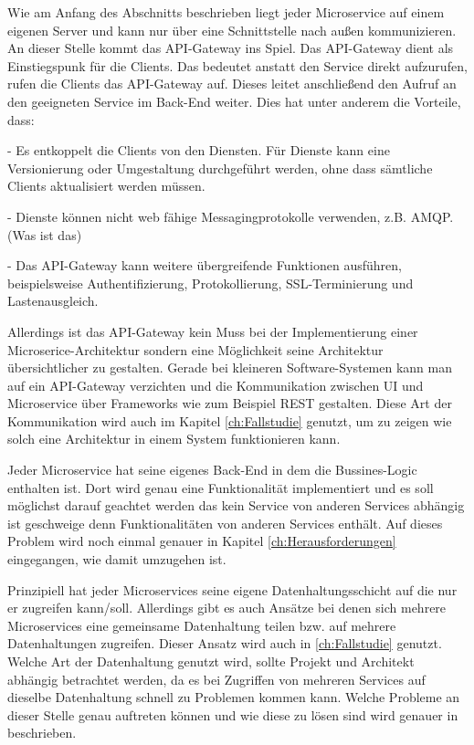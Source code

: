 Wie am Anfang des Abschnitts beschrieben liegt jeder Microservice auf einem eigenen Server und kann nur über eine Schnittstelle nach außen kommunizieren. An dieser Stelle kommt das API-Gateway ins Spiel.
Das API-Gateway dient als Einstiegspunk für die Clients. Das bedeutet anstatt den Service direkt aufzurufen, rufen die Clients das API-Gateway auf. Dieses leitet anschließend den Aufruf an den geeigneten Service im Back-End weiter.  Dies hat unter anderem die Vorteile, dass\cite{microsoft}:
\begin{description}
	\item - Es entkoppelt die Clients von den Diensten. Für Dienste kann eine Versionierung oder Umgestaltung durchgeführt werden, ohne dass sämtliche Clients aktualisiert werden müssen. 
	\item - Dienste können nicht web fähige Messagingprotokolle verwenden, z.B. AMQP. (Was ist das)
	\item - Das API-Gateway kann weitere übergreifende Funktionen ausführen, beispielsweise Authentifizierung, Protokollierung, SSL-Terminierung und Lastenausgleich.
\end{description}

Allerdings ist das API-Gateway kein Muss bei der Implementierung einer Microserice-Architektur sondern eine Möglichkeit seine Architektur übersichtlicher zu gestalten. Gerade bei kleineren Software-Systemen kann man auf ein API-Gateway verzichten und die Kommunikation zwischen UI und Microservice über Frameworks wie zum Beispiel REST gestalten. Diese Art der Kommunikation wird auch im Kapitel \ref{ch:Fallstudie} genutzt, um zu zeigen wie solch eine Architektur in einem System funktionieren kann.\newline\newline


Jeder Microservice hat seine eigenes Back-End in dem die Bussines-Logic enthalten ist. Dort wird genau eine Funktionalität implementiert und es soll möglichst darauf geachtet werden das kein Service von anderen Services abhängig ist geschweige denn Funktionalitäten von anderen Services enthält. Auf dieses Problem wird noch einmal genauer in Kapitel \ref{ch:Herausforderungen} eingegangen, wie damit umzugehen ist.\newline\newline

Prinzipiell hat jeder Microservices seine eigene Datenhaltungsschicht auf die nur er zugreifen kann/soll. Allerdings gibt es auch Ansätze bei denen sich mehrere Microservices eine gemeinsame Datenhaltung teilen bzw. auf mehrere Datenhaltungen zugreifen. Dieser Ansatz wird auch in \ref{ch:Fallstudie} genutzt. 
Welche Art der Datenhaltung genutzt wird, sollte Projekt und Architekt abhängig betrachtet werden, da es bei Zugriffen von mehreren Services auf dieselbe Datenhaltung schnell zu Problemen kommen kann. Welche Probleme an dieser Stelle genau auftreten können und wie diese zu lösen sind wird genauer in  beschrieben.


